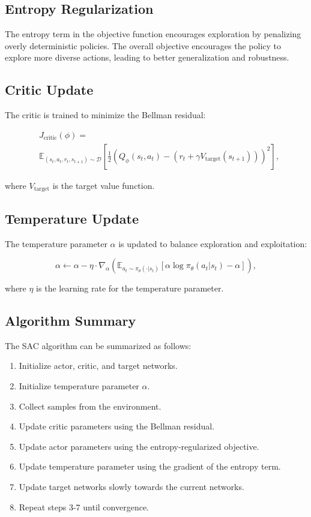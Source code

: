 \documentclass[conference]{IEEEtran}
\begin{document}
\subsection{Entropy Regularization}

The entropy term in the objective function encourages exploration by penalizing overly deterministic policies. The overall objective encourages the policy to explore more diverse actions, leading to better generalization and robustness.

\subsection{Critic Update}

The critic is trained to minimize the Bellman residual:

\begin{align}
&J_{\text{critic}}(\phi) =\\ &\mathbb{E}_{(s_t, a_t, r_t, s_{t+1}) \sim \mathcal{D}} \left[ \frac{1}{2} \left( Q_{\phi}(s_t, a_t) - (r_t + \gamma V_{\text{target}}(s_{t+1})) \right)^2 \right],
\end{align}

where $V_{\text{target}}$ is the target value function.

\subsection{Temperature Update}

The temperature parameter $\alpha$ is updated to balance exploration and exploitation:

\begin{equation}
\alpha \leftarrow \alpha - \eta \cdot \nabla_{\alpha} \left( \mathbb{E}_{a_t \sim \pi_{\theta}(\cdot|s_t)} \left[ \alpha \log \pi_{\theta}(a_t|s_t) - \alpha \right] \right),
\end{equation}

where $\eta$ is the learning rate for the temperature parameter.

\subsection{Algorithm Summary}

The SAC algorithm can be summarized as follows:

\begin{enumerate}
  \item Initialize actor, critic, and target networks.
  \item Initialize temperature parameter $\alpha$.
  \item Collect samples from the environment.
  \item Update critic parameters using the Bellman residual.
  \item Update actor parameters using the entropy-regularized objective.
  \item Update temperature parameter using the gradient of the entropy term.
  \item Update target networks slowly towards the current networks.
  \item Repeat steps 3-7 until convergence.
\end{enumerate}
\end{document}
